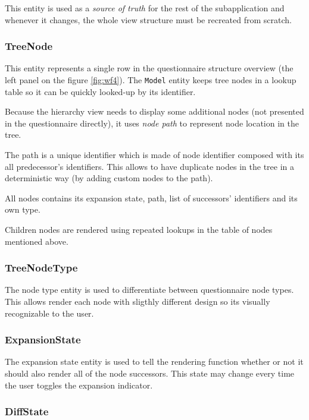 This entity is used as a \textit{source of truth} for the rest of the subapplication and whenever it changes, the whole view structure must be recreated from scratch.

\subsubsection*{TreeNode}

This entity represents a single row in the questionnaire structure overview (the left panel on the figure \ref{fig:wf4}).
The \texttt{Model} entity keeps tree nodes in a lookup table so it can be quickly looked-up by its identifier.

Because the hierarchy view needs to display some additional nodes (not presented in the questionnaire directly), it uses \textit{node path} to represent node location in the tree.

The path is a unique identifier which is made of node identifier composed with its all predecessor's identifiers.
This allows to have duplicate nodes in the tree in a deterministic way (by adding custom nodes to the path).

All nodes contains its expansion state, path, list of successors' identifiers and its own type.

Children nodes are rendered using repeated lookups in the table of nodes mentioned above.

\subsubsection*{TreeNodeType}

The node type entity is used to differentiate between questionnaire node types.
This allows render each node with sligthly different design so its visually recognizable to the user.

\subsubsection*{ExpansionState}

The expansion state entity is used to tell the rendering function whether or not it should also render all of the node successors.
This state may change every time the user toggles the expansion indicator.

\subsubsection*{DiffState}

